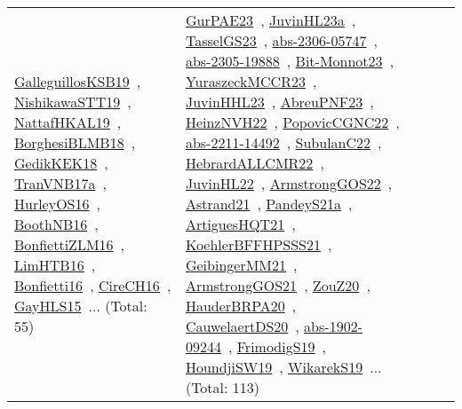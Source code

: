 {\begin{longtable}{lp{3cm}>{\raggedright\arraybackslash}p{6cm}>{\raggedright\arraybackslash}p{6cm}>{\raggedright\arraybackslash}p{8cm}}
\href{works/GalleguillosKSB19.pdf}{GalleguillosKSB19}~\cite{GalleguillosKSB19}, \href{works/NishikawaSTT19.pdf}{NishikawaSTT19}~\cite{NishikawaSTT19}, \href{works/NattafHKAL19.pdf}{NattafHKAL19}~\cite{NattafHKAL19}, \href{works/BorghesiBLMB18.pdf}{BorghesiBLMB18}~\cite{BorghesiBLMB18}, \href{works/GedikKEK18.pdf}{GedikKEK18}~\cite{GedikKEK18}, \href{works/TranVNB17a.pdf}{TranVNB17a}~\cite{TranVNB17a}, \href{works/HurleyOS16.pdf}{HurleyOS16}~\cite{HurleyOS16}, \href{works/BoothNB16.pdf}{BoothNB16}~\cite{BoothNB16}, \href{works/BonfiettiZLM16.pdf}{BonfiettiZLM16}~\cite{BonfiettiZLM16}, \href{works/LimHTB16.pdf}{LimHTB16}~\cite{LimHTB16}, \href{works/Bonfietti16.pdf}{Bonfietti16}~\cite{Bonfietti16}, \href{works/CireCH16.pdf}{CireCH16}~\cite{CireCH16}, \href{works/GayHLS15.pdf}{GayHLS15}~\cite{GayHLS15}... (Total: 55) & \href{works/GurPAE23.pdf}{GurPAE23}~\cite{GurPAE23}, \href{works/JuvinHL23a.pdf}{JuvinHL23a}~\cite{JuvinHL23a}, \href{works/TasselGS23.pdf}{TasselGS23}~\cite{TasselGS23}, \href{works/abs-2306-05747.pdf}{abs-2306-05747}~\cite{abs-2306-05747}, \href{works/abs-2305-19888.pdf}{abs-2305-19888}~\cite{abs-2305-19888}, \href{works/Bit-Monnot23.pdf}{Bit-Monnot23}~\cite{Bit-Monnot23}, \href{works/YuraszeckMCCR23.pdf}{YuraszeckMCCR23}~\cite{YuraszeckMCCR23}, \href{works/JuvinHHL23.pdf}{JuvinHHL23}~\cite{JuvinHHL23}, \href{works/AbreuPNF23.pdf}{AbreuPNF23}~\cite{AbreuPNF23}, \href{works/HeinzNVH22.pdf}{HeinzNVH22}~\cite{HeinzNVH22}, \href{works/PopovicCGNC22.pdf}{PopovicCGNC22}~\cite{PopovicCGNC22}, \href{works/abs-2211-14492.pdf}{abs-2211-14492}~\cite{abs-2211-14492}, \href{works/SubulanC22.pdf}{SubulanC22}~\cite{SubulanC22}, \href{works/HebrardALLCMR22.pdf}{HebrardALLCMR22}~\cite{HebrardALLCMR22}, \href{works/JuvinHL22.pdf}{JuvinHL22}~\cite{JuvinHL22}, \href{works/ArmstrongGOS22.pdf}{ArmstrongGOS22}~\cite{ArmstrongGOS22}, \href{works/Astrand21.pdf}{Astrand21}~\cite{Astrand21}, \href{works/PandeyS21a.pdf}{PandeyS21a}~\cite{PandeyS21a}, \href{works/ArtiguesHQT21.pdf}{ArtiguesHQT21}~\cite{ArtiguesHQT21}, \href{works/KoehlerBFFHPSSS21.pdf}{KoehlerBFFHPSSS21}~\cite{KoehlerBFFHPSSS21}, \href{works/GeibingerMM21.pdf}{GeibingerMM21}~\cite{GeibingerMM21}, \href{works/ArmstrongGOS21.pdf}{ArmstrongGOS21}~\cite{ArmstrongGOS21}, \href{works/ZouZ20.pdf}{ZouZ20}~\cite{ZouZ20}, \href{works/HauderBRPA20.pdf}{HauderBRPA20}~\cite{HauderBRPA20}, \href{works/CauwelaertDS20.pdf}{CauwelaertDS20}~\cite{CauwelaertDS20}, \href{works/abs-1902-09244.pdf}{abs-1902-09244}~\cite{abs-1902-09244}, \href{works/FrimodigS19.pdf}{FrimodigS19}~\cite{FrimodigS19}, \href{works/HoundjiSW19.pdf}{HoundjiSW19}~\cite{HoundjiSW19}, \href{works/WikarekS19.pdf}{WikarekS19}~\cite{WikarekS19}... (Total: 113)\\

\end{longtable}}
